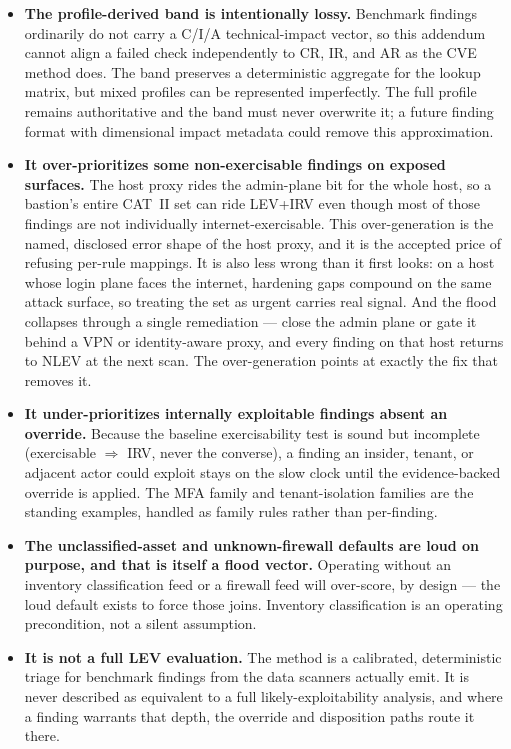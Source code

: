 \documentclass[11pt]{article}
\begin{document}
\begin{itemize}[leftmargin=1.4em,topsep=3pt]
\item \textbf{The profile-derived band is intentionally lossy.} Benchmark findings
  ordinarily do not carry a C/I/A technical-impact vector, so this addendum cannot
  align a failed check independently to CR, IR, and AR as the CVE method does. The
  band preserves a deterministic aggregate for the lookup matrix, but mixed
  profiles can be represented imperfectly. The full profile remains authoritative
  and the band must never overwrite it; a future finding format with dimensional
  impact metadata could remove this approximation.
\item \textbf{It over-prioritizes some non-exercisable findings on exposed surfaces.}
  The host proxy rides the admin-plane bit for the whole host, so a bastion's entire
  CAT~II set can ride LEV+IRV even though most of those findings are not individually
  internet-exercisable. This over-generation is the named, disclosed error shape of
  the host proxy, and it is the accepted price of refusing per-rule mappings. It is
  also less wrong than it first looks: on a host whose login plane faces the
  internet, hardening gaps compound on the same attack surface, so treating the set
  as urgent carries real signal. And the flood collapses through a single
  remediation --- close the admin plane or gate it behind a VPN or identity-aware
  proxy, and every finding on that host returns to NLEV at the next scan. The
  over-generation points at exactly the fix that removes it.
\item \textbf{It under-prioritizes internally exploitable findings absent an
  override.} Because the baseline exercisability test is sound but incomplete
  (exercisable ${}\Longrightarrow{}$ IRV, never the converse), a finding an insider,
  tenant, or adjacent actor could exploit stays on the slow clock until the
  evidence-backed override is applied. The MFA family and tenant-isolation families
  are the standing examples, handled as family rules rather than per-finding.
\item \textbf{The unclassified-asset and unknown-firewall defaults are loud on
  purpose, and that is itself a flood vector.} Operating without an inventory
  classification feed or a firewall feed will over-score, by design --- the loud
  default exists to force those joins. Inventory classification is an operating
  precondition, not a silent assumption.
\item \textbf{It is not a full LEV evaluation.} The method is a calibrated,
  deterministic triage for benchmark findings from the data scanners actually emit. It
  is never described as equivalent to a full likely-exploitability analysis, and where
  a finding warrants that depth, the override and disposition paths route it there.
\end{itemize}
\end{document}
